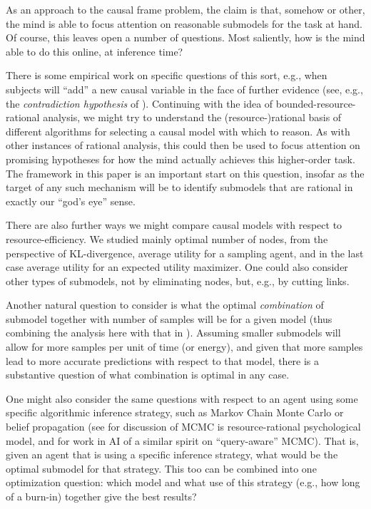 \documentclass[10pt,letterpaper]{article}
\begin{document}
As an approach to the causal frame problem, the claim is that, somehow or other, the mind is able to focus attention on reasonable submodels for the task at hand. Of course, this leaves open a number of questions. Most saliently, how is the mind able to do this online, at inference time?

There is some empirical work on specific questions of this sort, e.g., when subjects will ``add'' a new causal variable in the face of further evidence (see, e.g., the \emph{contradiction hypothesis} of \citealt{Park}). Continuing with the idea of bounded-resource-rational analysis, we might try to understand the (resource-)rational basis of different algorithms for selecting a causal model with which to reason. As with other instances of rational analysis, this could then be used to focus attention on promising hypotheses for how the mind actually achieves this higher-order task. The framework in this paper is an important start on this question, insofar as the target of any such mechanism will be to identify submodels that are rational in exactly our ``god's eye'' sense.

There are also further ways we might compare causal models with respect to resource-efficiency. We studied mainly optimal number of nodes, from the perspective of KL-divergence, average utility for a sampling agent, and in the last case average utility for an expected utility maximizer. One could also consider other types of submodels, not by eliminating nodes, but, e.g., by cutting links.

Another natural question to consider is what the optimal \emph{combination} of submodel together with number of samples will be for a given model (thus combining the analysis here with that in \citealt{Vul2014}). Assuming smaller submodels will allow for more samples per unit of time (or energy), and given that more samples lead to more accurate predictions with respect to that model, there is a substantive question of what combination is optimal in any case.

One might also consider the same questions with respect to an agent using some specific algorithmic inference strategy, such as Markov Chain Monte Carlo or belief propagation (see \citealt{Griffiths2014} for discussion of MCMC is resource-rational psychological model, and \citealt{WickMcCallum} for work in AI of a similar spirit on ``query-aware'' MCMC). That is, given an agent that is using a specific inference strategy, what would be the optimal submodel for that strategy. This too can be combined into one optimization question: which model and what use of this strategy (e.g., how long of a burn-in) together give the best results?
\end{document}
